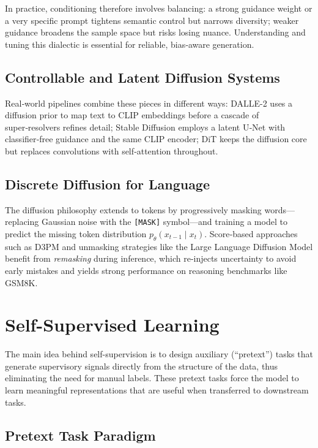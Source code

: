 \documentclass{article}
\begin{document}
In practice, conditioning therefore involves balancing: a strong guidance weight or a very specific prompt tightens semantic control but narrows diversity; weaker guidance broadens the sample space but risks losing nuance.  Understanding and tuning this dialectic is essential for reliable, bias‑aware generation.

\subsection{Controllable and Latent Diffusion Systems}
Real‑world pipelines combine these pieces in different ways: DALLE-2 uses a diffusion prior to map text to CLIP embeddings before a cascade of super‑resolvers refines detail; Stable Diffusion employs a latent U‑Net with classifier‑free guidance and the same CLIP encoder; DiT keeps the diffusion core but replaces convolutions with self‑attention throughout.

\subsection{Discrete Diffusion for Language}
The diffusion philosophy extends to tokens by progressively masking words—replacing Gaussian noise with the \texttt{[MASK]} symbol—and training a model to predict the missing token distribution \(p_\theta(x_{t-1}\!\mid\!x_t)\).  Score‑based approaches such as D3PM and unmasking strategies like the Large Language Diffusion Model benefit from \emph{remasking} during inference, which re‑injects uncertainty to avoid early mistakes and yields strong performance on reasoning benchmarks like GSM8K.

\clearpage\newpage

\section{Self-Supervised Learning}

The main idea behind self-supervision is to design auxiliary (“pretext”) tasks that generate supervisory signals directly from the structure of the data, thus eliminating the need for manual labels. These pretext tasks force the model to learn meaningful representations that are useful when transferred to downstream tasks.

\subsection{Pretext Task Paradigm}
\end{document}
